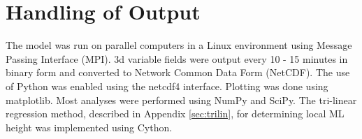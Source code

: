 \section{Handling of Output}

The model was run on parallel computers in a Linux environment using Message Passing Interface (MPI). 3d variable fields were output every 10 - 15 minutes in binary form and converted to Network Common Data Form (NetCDF).  The use of Python was enabled using the netcdf4 interface.  Plotting was done using matplotlib. Most analyses were performed using NumPy and SciPy.  The tri-linear regression method, described in Appendix \ref{sec:trilin}, for determining local \acs{ML} height was implemented using Cython.

\endinput

Any text after an \endinput is ignored.
You could put scraps here or things in progress.
